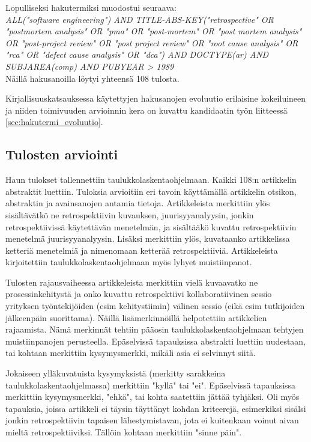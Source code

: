 Lopulliseksi hakutermiksi muodostui seuraava:\\
\textit{ALL("software engineering") AND TITLE-ABS-KEY("retrospective" OR "postmortem analysis" OR "pma" OR "post-mortem" OR "post mortem analysis" OR "post-project review" OR "post project review" OR "root cause analysis" OR "rca" OR "defect cause analysis" OR "dca") AND DOCTYPE(ar) AND SUBJAREA(comp) AND PUBYEAR > 1989}\\
Näillä hakusanoilla löytyi yhteensä 108 tulosta.

Kirjallisuuskatsauksessa käytettyjen hakusanojen evoluutio erilaisine kokeiluineen ja niiden toimivuuden arvioinnin kera on kuvattu kandidaatin työn liitteessä \ref{sec:hakutermi_evoluutio}.

\subsection{Tulosten arviointi}
Haun tulokset tallennettiin taulukkolaskentaohjelmaan. Kaikki 108:n artikkelin abstraktit luettiin. Tuloksia arvioitiin eri tavoin käyttämällä artikkelin otsikon, abstraktin ja avainsanojen antamia tietoja. Artikkeleista merkittiin ylös sisältävätkö ne retrospektiivin kuvauksen, juurisyyanalyysin, jonkin retrospektiivissä käytettävän menetelmän, ja sisältääkö kuvattu retrospektiivin menetelmä juurisyyanalyysin. Lisäksi merkittiin ylös, kuvataanko artikkelissa ketteriä menetelmiä ja nimenomaan ketterää retrospektiiviä. Artikkeleista kirjoitettiin taulukkolaskentaohjelmaan myös lyhyet muistiinpanot.

Tulosten rajausvaiheessa artikkeleista merkittiin vielä kuvaavatko ne prosessinkehitystä ja onko kuvattu retrospektiivi kollaboratiivinen sessio yrityksen työntekijöiden (esim kehitystiimin) välinen sessio (eikä esim tutkijoiden jälkeenpäin suorittama). Näillä lisämerkinnöillä helpotettiin artikkelien rajaamista. Nämä merkinnät tehtiin pääosin taulukkolaskentaohjelmaan tehtyjen muistiinpanojen perusteella. Epäselvissä tapauksissa abstrakti luettiin uudestaan, tai  kohtaan merkittiin kysymysmerkki, mikäli asia ei selvinnyt siitä.

Jokaiseen ylläkuvatuista kysymyksistä (merkitty sarakkeina taulukkolaskentaohjelmassa) merkittiin "kyllä" tai "ei". Epäselvissä tapauksissa merkittiin kysymysmerkki, "ehkä", tai kohta saatettiin jättää tyhjäksi. Oli myös tapauksia, joissa artikkeli ei täysin täyttänyt kohdan kriteerejä, esimerkiksi sisälsi jonkin retrospektiivin tapaisen lähestymistavan, jota ei kuitenkaan voinut aivan mieltä retrospektiiviksi. Tällöin kohtaan merkittiin "sinne päin".

